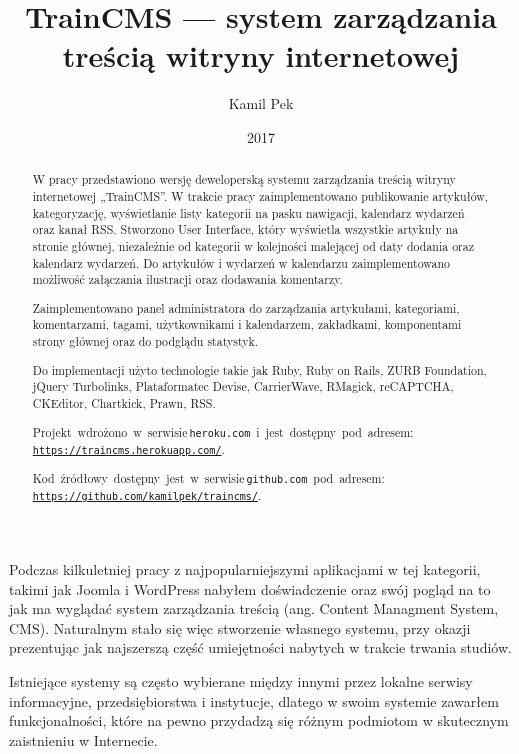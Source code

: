 \documentclass[openright]{xmgr}
\author   {Kamil Pek}
\title    {TrainCMS --- system zarządzania treścią witryny internetowej}
\date     {2017}
\begin{document}
\begin{abstract}
W pracy przedstawiono wersję deweloperską systemu zarządzania treścią witryny internetowej „TrainCMS”. W trakcie pracy zaimplementowano publikowanie artykułów, kategoryzację, wyświetlanie listy kategorii na pasku nawigacji, kalendarz wydarzeń oraz kanał RSS. Stworzono User Interface, który wyświetla wszystkie artykuły na stronie głównej, niezależnie od kategorii w kolejności malejącej od daty dodania oraz kalendarz wydarzeń. Do artykułów i wydarzeń w kalendarzu zaimplementowano możliwość załączania ilustracji oraz dodawania komentarzy.

Zaimplementowano panel administratora do zarządzania artykułami, kategoriami, komentarzami, tagami, użytkownikami i kalendarzem, zakładkami, komponentami strony głównej oraz do podglądu statystyk.

Do implementacji użyto technologie takie jak Ruby, Ruby on Rails, ZURB Foundation, jQuery Turbolinks, Plataformatec Devise, CarrierWave, RMagick, reCAPTCHA, CKEditor, Chartkick, Prawn, RSS.

\mbox{Projekt wdrożono w serwisie\, \\\texttt{heroku.com} i jest dostępny pod adresem:} \\\texttt{\url{https://traincms.herokuapp.com/}}.

\mbox{Kod źródłowy dostępny jest w serwisie\, \\\texttt{github.com} pod adresem:} \\\texttt{\url{https://github.com/kamilpek/traincms/}}.
\end{abstract}


\maketitle

\introduction
Podczas kilkuletniej pracy z najpopularniejszymi aplikacjami w tej kategorii, takimi jak Joomla i WordPress nabyłem doświadczenie oraz swój pogląd na to jak ma wyglądać system zarządzania treścią (ang. Content Managment System, CMS). Naturalnym stało się więc stworzenie własnego systemu, przy okazji prezentując jak najszerszą część umiejętności nabytych w trakcie trwania studiów.

Istniejące systemy są często wybierane między innymi przez lokalne serwisy informacyjne, przedsiębiorstwa i instytucje, dlatego w swoim systemie zawarłem funkcjonalności, które na pewno przydadzą się różnym podmiotom w skutecznym zaistnieniu w Internecie.
\end{document}
